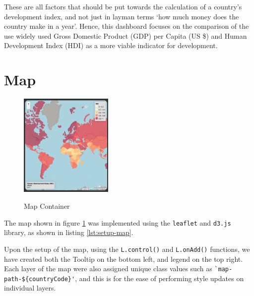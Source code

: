 \documentclass{scrreprt}
\begin{document}
These are all factors that should be put towards the calculation of a country's development index, and not just in layman terms `how much money does the country make in a year'. Hence, this dashboard focuses on the comparison of the use widely used Gross Domestic Product (GDP) per Capita (US \$) and Human Development Index (HDI) as a more viable indicator for development. 

\section{Map}
\begin{figure}[H]
    \centering
    \includegraphics[width = 0.4\textwidth]{images/map_1.png}
    \label{fig:map}
    \caption{Map Container}
\end{figure}
The map shown in figure \ref{fig:map} was implemented using the \verb|leaflet| and \verb|d3.js| library, as shown in listing \ref*{lst:setup-map}.

Upon the setup of the map, using the \verb|L.control()| and \verb|L.onAdd()| functions, we have created both the Tooltip on the bottom left, and legend on the top right. Each layer of the map were also assigned unique class values such as \verb|`map-path-${countryCode}'|, and this is for the ease of performing style updates on individual layers. 
\end{document}
